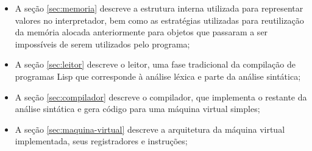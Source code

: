 \begin{itemize}

\item A seção \ref{sec:memoria} descreve a estrutura interna utilizada para
representar valores no interpretador, bem como as estratégias utilizadas para
reutilização da memória alocada anteriormente para objetos que passaram a ser
impossíveis de serem utilizados pelo programa;

\item A seção \ref{sec:leitor} descreve o leitor, uma fase tradicional da
compilação de programas Lisp que corresponde à análise léxica e parte da
análise sintática;

\item A seção \ref{sec:compilador} descreve o compilador, que implementa o
restante da análise sintática e gera código para uma máquina virtual simples;

\item A seção \ref{sec:maquina-virtual} descreve a arquitetura da máquina
virtual implementada, seus registradores e instruções;


\end{itemize}

